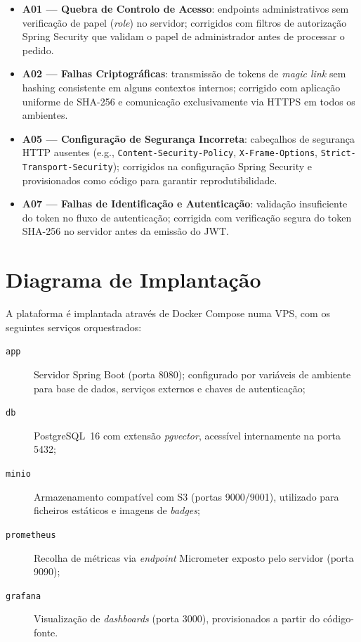\begin{itemize}
  \item \textbf{A01 --- Quebra de Controlo de Acesso}: endpoints administrativos sem verificação de papel (\textit{role}) no servidor; corrigidos com filtros de autorização Spring Security que validam o papel de administrador antes de processar o pedido.

  \item \textbf{A02 --- Falhas Criptográficas}: transmissão de tokens de \textit{magic link} sem hashing consistente em alguns contextos internos; corrigido com aplicação uniforme de SHA-256 e comunicação exclusivamente via HTTPS em todos os ambientes.

  \item \textbf{A05 --- Configuração de Segurança Incorreta}: cabeçalhos de segurança HTTP ausentes (e.g., \texttt{Content-Security-Policy}, \texttt{X-Frame-Options}, \texttt{Strict-Transport-Security}); corrigidos na configuração Spring Security e provisionados como código para garantir reprodutibilidade.

  \item \textbf{A07 --- Falhas de Identificação e Autenticação}: validação insuficiente do token no fluxo de autenticação; corrigida com verificação segura do token SHA-256 no servidor antes da emissão do JWT.
\end{itemize}

\section{Diagrama de Implantação}
\label{sec:diagrama_implantacao}

A plataforma é implantada através de Docker Compose numa VPS, com os seguintes serviços orquestrados:

\begin{description}
  \item[\texttt{app}] Servidor Spring Boot (porta 8080); configurado por variáveis de ambiente para base de dados, serviços externos e chaves de autenticação;
  \item[\texttt{db}] PostgreSQL~16 com extensão \textit{pgvector}, acessível internamente na porta 5432;
  \item[\texttt{minio}] Armazenamento compatível com S3 (portas 9000/9001), utilizado para ficheiros estáticos e imagens de \textit{badges};
  \item[\texttt{prometheus}] Recolha de métricas via \textit{endpoint} Micrometer exposto pelo servidor (porta 9090);
  \item[\texttt{grafana}] Visualização de \textit{dashboards} (porta 3000), provisionados a partir do código-fonte.
\end{description}

